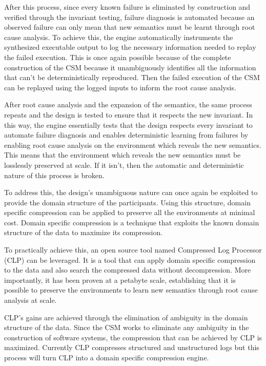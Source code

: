 After this process, since every known failure is eliminated by construction and verified through the invariant testing, failure diagnosis is automated because an observed failure can only mean that new semantics must be learnt through root cause analysis. To achieve this, the engine automatically instruments the synthesized executable output to log the necessary information needed to replay the failed execution. This is once again possible because of the complete construction of the CSM because it unambiguously identifies all the information that can't be deterministically reproduced. Then the failed execution of the CSM can be replayed using the logged inputs to inform the root cause analysis.

After root cause analysis and the expansion of the semantics, the same process repeats and the design is tested to ensure that it respects the new invariant. In this way, the engine essentially tests that the design respects every invariant to automate failure diagnosis and enables deterministic learning from failures by enabling root cause analysis on the environment which reveals the new semantics. This means that the environment which reveals the new semantics must be losslessly preserved at scale. If it isn't, then the automatic and deterministic nature of this process is broken.

To address this, the design's unambiguous nature can once again be exploited to provide the domain structure of the participants. Using this structure, domain specific compression can be applied to preserve all the environments at minimal cost. Domain specific compression is a technique that exploits the known domain structure of the data to maximize its compression.

To practically achieve this, an open source tool named Compressed Log Processor (CLP) can be leveraged. It is a tool that can apply domain specific compression to the data and also search the compressed data without decompression. More importantly, it has been proven at a petabyte scale, establishing that it is possible to preserve the environments to learn new semantics through root cause analysis at scale.

CLP’s gains are achieved through the elimination of ambiguity in the domain structure of the data. Since the CSM works to eliminate any ambiguity in the construction of software systems, the compression that can be achieved by CLP is maximized. Currently CLP compresses structured and unstructured logs but this process will turn CLP into a domain specific compression engine.

